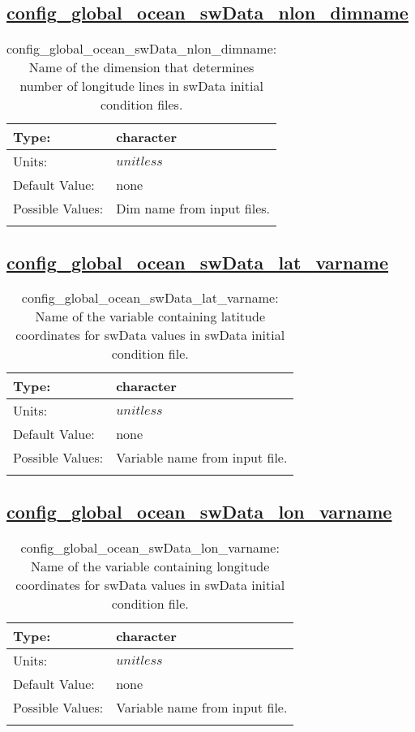 \subsection[config\_global\_ocean\_swData\_nlon\_dimname]{\hyperref[sec:nm_tab_global_ocean]{config\_global\_ocean\_swData\_nlon\_dimname}}
\label{subsec:nm_sec_config_global_ocean_swData_nlon_dimname}
\begin{center}
\begin{longtable}{| p{2.0in} || p{4.0in} |}
    \hline
    Type: & character \\
    \hline
    Units: & $unitless$ \\
    \hline
    Default Value: & none \\
    \hline
    Possible Values: & Dim name from input files. \\
    \hline
    \caption{config\_global\_ocean\_swData\_nlon\_dimname: Name of the dimension that determines number of longitude lines in swData initial condition files.}
\end{longtable}
\end{center}
\subsection[config\_global\_ocean\_swData\_lat\_varname]{\hyperref[sec:nm_tab_global_ocean]{config\_global\_ocean\_swData\_lat\_varname}}
\label{subsec:nm_sec_config_global_ocean_swData_lat_varname}
\begin{center}
\begin{longtable}{| p{2.0in} || p{4.0in} |}
    \hline
    Type: & character \\
    \hline
    Units: & $unitless$ \\
    \hline
    Default Value: & none \\
    \hline
    Possible Values: & Variable name from input file. \\
    \hline
    \caption{config\_global\_ocean\_swData\_lat\_varname: Name of the variable containing latitude coordinates for swData values in swData initial condition file.}
\end{longtable}
\end{center}
\subsection[config\_global\_ocean\_swData\_lon\_varname]{\hyperref[sec:nm_tab_global_ocean]{config\_global\_ocean\_swData\_lon\_varname}}
\label{subsec:nm_sec_config_global_ocean_swData_lon_varname}
\begin{center}
\begin{longtable}{| p{2.0in} || p{4.0in} |}
    \hline
    Type: & character \\
    \hline
    Units: & $unitless$ \\
    \hline
    Default Value: & none \\
    \hline
    Possible Values: & Variable name from input file. \\
    \hline
    \caption{config\_global\_ocean\_swData\_lon\_varname: Name of the variable containing longitude coordinates for swData values in swData initial condition file.}
\end{longtable}
\end{center}
